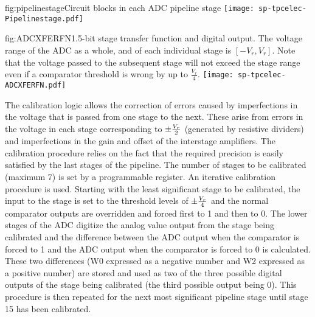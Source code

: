 \begin{dunefigure}{fig:pipelinestage}{Circuit blocks in each ADC pipeline stage}
\texttt{[image: sp-tpcelec-Pipelinestage.pdf]}
\end{dunefigure}

\begin{dunefigure}{fig:ADCXFERFN}{1.5-bit stage transfer function and digital output. The voltage range of the ADC as a whole, and of each individual stage is $[-V_r,V_r]$.  Note that the voltage passed to the subsequent stage will not exceed the stage range even if a comparator threshold is wrong by up to $\frac{V_r}{4}$.}
\texttt{[image: sp-tpcelec-ADCXFERFN.pdf]}
\end{dunefigure}

The calibration logic allows the correction of errors caused by imperfections in the voltage that is passed from one stage to the next.  These arise from errors in the voltage in each stage corresponding to $\pm{V_{r}\over{2}}$ (generated by resistive dividers) and imperfections in the gain and offset of the interstage amplifiers.  The calibration procedure relies on the fact that the required precision is easily satisfied by the last stages of the pipeline.  The number of stages to be calibrated (maximum 7) is set by a programmable register.  An iterative calibration procedure is used.
Starting with the least significant stage to be calibrated, the input to the stage is set to the threshold levels of $\pm{V_{r}\over{4}}$ and the normal comparator outputs are overridden and forced first to 1 and then to 0.  The lower stages of the ADC digitize the analog value output from the stage being calibrated and the difference between the ADC output when the comparator is forced to 1 and the ADC output when the comparator is forced to 0 is calculated.  These two differences (W0 expressed as a negative number and W2 expressed as a positive number) are stored and used as two of the three possible digital outputs of the stage being calibrated (the third possible output being 0).  This procedure is then repeated for the next most significant pipeline stage until stage 15 has been calibrated.

